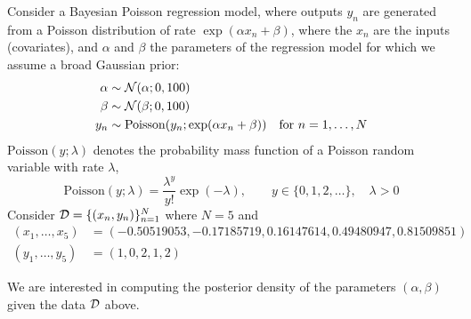 \label{q:poisson-reg}
  Consider a Bayesian Poisson regression
  model, where outputs $y_n$ are generated from a Poisson distribution
  of rate $\exp(\alpha x_n + \beta)$, where the $x_n$ are the inputs (covariates), and $\alpha$ and $\beta$ the parameters of the regression model for which we assume a broad Gaussian prior:
  \begin{align}
    \alpha &\sim \mathcal{N}(\alpha; 0, 100) \\
    \beta &\sim \mathcal{N}(\beta; 0, 100)\\
    y_n &\sim \mathrm{Poisson}(y_n; \exp(\alpha x_n + \beta)) \quad \text{for } n = 1, \dots, N 
\end{align}
$\mathrm{Poisson}(y ;\lambda)$ denotes the probability mass
function of a Poisson random variable with rate $\lambda$,
\begin{equation}
  \mathrm{Poisson}(y; \lambda) = \frac{\lambda^y}{y!}\exp(-\lambda), \quad \quad y \in \{0, 1, 2, \ldots\}, \quad \lambda>0
\end{equation}
Consider $\mathcal{D} = \{(x_n, y_n)\}_{n=1}^N$ where $N=5$ and
\begin{align}
(x_1, \ldots, x_5) &= (-0.50519053, -0.17185719,  0.16147614,  0.49480947,  0.81509851)\\
  (y_1, \ldots, y_5) &= (1, 0, 2, 1, 2)
\end{align}

We are interested in computing the posterior density of the parameters
$(\alpha, \beta)$ given the data $\mathcal{D}$ above.

